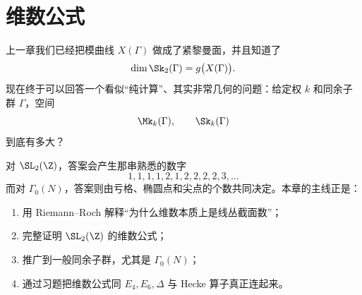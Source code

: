 \chapter{维数公式}
\label{ch:dimension}

上一章我们已经把模曲线 $X(\Gamma)$ 做成了紧黎曼面，并且知道了
\[
  \dim \Sk_2(\Gamma)=g\bigl(X(\Gamma)\bigr).
\]
现在终于可以回答一个看似“纯计算”、其实非常几何的问题：给定权 $k$ 和同余子群 $\Gamma$，空间
\[
  \Mk_k(\Gamma),\qquad \Sk_k(\Gamma)
\]
到底有多大？

对 $\SL_2(\Z)$，答案会产生那串熟悉的数字
\[
  1,1,1,1,2,1,2,2,2,2,3,\dots
\]
而对 $\Gamma_0(N)$，答案则由亏格、椭圆点和尖点的个数共同决定。本章的主线正是：
\begin{enumerate}
  \item 用 Riemann--Roch 解释“为什么维数本质上是线丛截面数”；
  \item 完整证明 $\SL_2(\Z)$ 的维数公式；
  \item 推广到一般同余子群，尤其是 $\Gamma_0(N)$；
  \item 通过习题把维数公式同 $E_4,E_6,\Delta$ 与 Hecke 算子真正连起来。
\end{enumerate}






